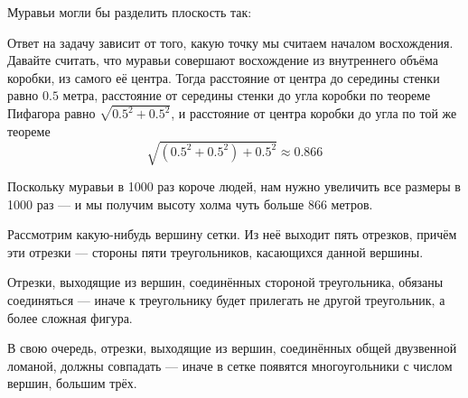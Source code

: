 \begin{itemize}
\itA Муравьи могли бы разделить плоскость так:

\begin{center}\end{center}

\itB Ответ на задачу зависит от того, какую точку мы считаем началом восхождения.
Давайте считать, что муравьи совершают восхождение из внутреннего объёма коробки, из самого её центра.
Тогда расстояние от центра до середины стенки равно $0.5$ метра, расстояние от середины стенки до угла
коробки по теореме Пифагора равно $\sqrt{0.5^2 + 0.5^2}$, и расстояние от центра коробки до угла по той же теореме
$$\sqrt{(0.5^2 + 0.5^2) + 0.5^2} \approx 0.866$$

Поскольку муравьи в 1000 раз короче людей, нам нужно увеличить все размеры в 1000 раз --- и мы 
получим высоту холма чуть больше 866 метров.

\itC Рассмотрим какую-нибудь вершину сетки. Из неё выходит пять отрезков, причём эти отрезки --- стороны пяти 
треугольников, касающихся данной вершины. 

\begin{center}\end{center}

Отрезки, выходящие из вершин, соединённых стороной треугольника, обязаны соединяться ---
иначе к треугольнику будет прилегать не другой треугольник, а более сложная фигура.

\begin{center}\end{center}

В свою очередь, отрезки, выходящие из вершин, соединённых общей двузвенной ломаной,
должны совпадать --- иначе в сетке появятся многоугольники с числом вершин, большим трёх.


\end{itemize}
